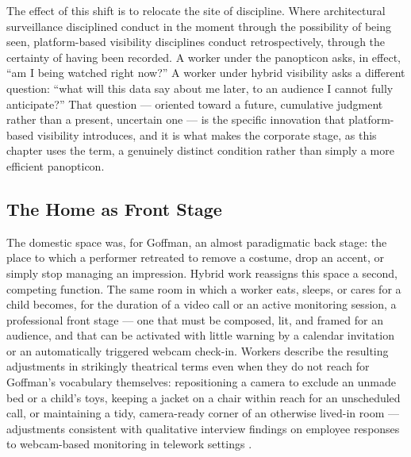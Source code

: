 \documentclass[10pt]{article}
\begin{document}
The effect of this shift is to relocate the site of discipline. Where architectural surveillance disciplined conduct in the moment through the possibility of being seen, platform-based visibility disciplines conduct retrospectively, through the certainty of having been recorded. A worker under the panopticon asks, in effect, ``am I being watched right now?'' A worker under hybrid visibility asks a different question: ``what will this data say about me later, to an audience I cannot fully anticipate?'' That question --- oriented toward a future, cumulative judgment rather than a present, uncertain one --- is the specific innovation that platform-based visibility introduces, and it is what makes the corporate stage, as this chapter uses the term, a genuinely distinct condition rather than simply a more efficient panopticon.

\subsection{The Home as Front Stage}

The domestic space was, for Goffman, an almost paradigmatic back stage: the place to which a performer retreated to remove a costume, drop an accent, or simply stop managing an impression. Hybrid work reassigns this space a second, competing function. The same room in which a worker eats, sleeps, or cares for a child becomes, for the duration of a video call or an active monitoring session, a professional front stage --- one that must be composed, lit, and framed for an audience, and that can be activated with little warning by a calendar invitation or an automatically triggered webcam check-in. Workers describe the resulting adjustments in strikingly theatrical terms even when they do not reach for Goffman's vocabulary themselves: repositioning a camera to exclude an unmade bed or a child's toys, keeping a jacket on a chair within reach for an unscheduled call, or maintaining a tidy, camera-ready corner of an otherwise lived-in room --- adjustments consistent with qualitative interview findings on employee responses to webcam-based monitoring in telework settings \cite{diard2025}.
\end{document}
